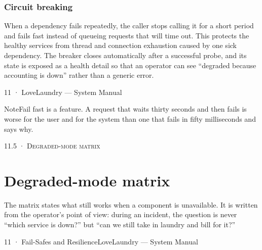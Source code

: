 \documentclass[11pt,a4paper,oneside]{book}
\begin{document}
\subsubsection*{Circuit breaking}
When a dependency fails repeatedly, the caller stops calling it for a short period and fails fast instead of queueing requests that will time out. This protects the healthy services from thread and connection exhaustion caused by one sick dependency. The breaker closes automatically after a successful probe, and its state is exposed as a health detail so that an operator can see “degraded because accounting is down” rather than a generic error.

11 · LoveLaundry — System Manual

\begin{notebox}NoteFail fast is a feature. A request that waits thirty seconds and then fails is worse for the user and for the system than one that fails in fifty milliseconds and says why.\end{notebox}
\textsc{\small\color{crimson}11.5 · Degraded-mode matrix}\par\medskip
\section*{Degraded-mode matrix}
The matrix states what still works when a component is unavailable. It is written from the operator's point of view: during an incident, the question is never “which service is down?” but “can we still take in laundry and bill for it?”

11 · Fail-Safes and ResilienceLoveLaundry — System Manual
\end{document}
